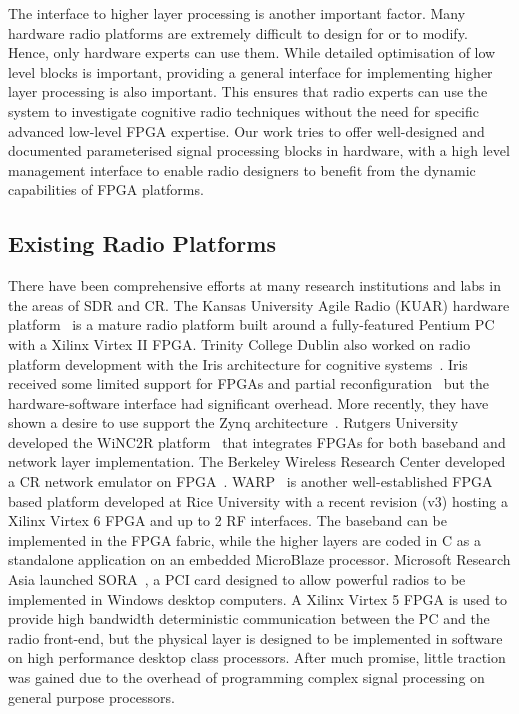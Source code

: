 The interface to higher layer processing is another important factor. Many hardware radio platforms are extremely difficult to design for or to modify. Hence, only hardware experts can use them. While detailed optimisation of low level blocks is important, providing a general interface for implementing higher layer processing is also important. This ensures that radio experts can use the system to investigate cognitive radio techniques without the need for specific advanced low-level FPGA expertise.
Our work tries to offer well-designed and documented parameterised signal processing blocks in hardware, with a high level management interface to enable radio designers to benefit from the dynamic capabilities of FPGA platforms.

\subsection{Existing Radio Platforms}
There have been comprehensive efforts at many research institutions and labs in the areas of SDR and CR.
The Kansas University Agile Radio (KUAR) hardware platform~\cite{Minden2007} is a mature radio platform built around a fully-featured Pentium PC with a Xilinx Virtex II FPGA.
Trinity College Dublin also worked on radio platform development with the Iris architecture for cognitive systems~\cite{Sutton2006}. Iris~\cite{Sutton2010} received some limited support for FPGAs and partial reconfiguration~\cite{fahmy2009,lotze2009} but the hardware-software interface had significant overhead. More recently, they have shown a desire to use support the Zynq architecture~\cite{Belt2013}.
Rutgers University developed the WiNC2R platform~\cite{Miljanic2007} that integrates FPGAs for both baseband and network layer implementation.
The Berkeley Wireless Research Center developed a CR network emulator on FPGA~\cite{So2008}.
WARP~\cite{amiri2007} is another well-established FPGA based platform developed at Rice University with a recent revision (v3) hosting a Xilinx Virtex 6 FPGA and up to 2 RF interfaces. The baseband can be implemented in the FPGA fabric, while the higher layers are coded in C as a standalone application on an embedded MicroBlaze processor.
Microsoft Research Asia launched SORA~\cite{tan2011sora}, a PCI card designed to allow powerful radios to be implemented in Windows desktop computers.
A Xilinx Virtex 5 FPGA is used to provide high bandwidth deterministic communication between the PC and the radio front-end, but the physical layer is designed to be implemented in software on high performance desktop class processors.
After much promise, little traction was gained due to the overhead of programming complex signal processing on general purpose processors.

